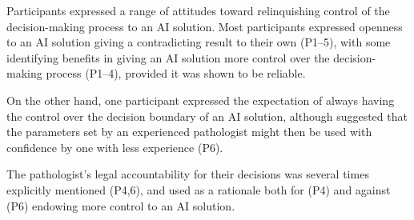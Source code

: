 
Participants expressed a range of attitudes toward relinquishing control of the decision-making process to an AI solution. Most participants expressed openness to an AI solution giving a contradicting result to their own (P1--5), with some identifying benefits in giving an AI solution more control over the decision-making process (P1--4), provided it was shown to be reliable. 

On the other hand, one participant expressed the expectation of always having the control over the decision boundary of an AI solution, although suggested that the parameters set by an experienced pathologist might then be used with confidence by one with less experience (P6).

The pathologist's legal accountability for their decisions was several times explicitly mentioned (P4,6), and used as a rationale both for (P4) and against (P6) endowing more control to an AI solution. 

    

